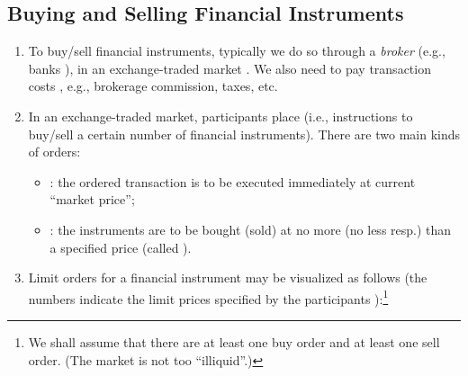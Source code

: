 \subsection{Buying and Selling Financial Instruments}
\begin{enumerate}
\item To buy/sell financial instruments, typically we do so through a
\emph{broker} (e.g., banks ), in an exchange-traded market
.  We also need to pay transaction costs
, e.g., brokerage commission, taxes, etc.

\item In an exchange-traded market, participants place  (i.e.,
instructions to buy/sell a certain number of financial instruments). There are
two main kinds of orders:
\begin{itemize}
\item {}: the ordered transaction is to be executed immediately at
current ``market price'';
\item {}: the instruments are to be bought (sold) at no more
(no less resp.) than a specified price (called ).
\end{itemize}

\item Limit orders for a financial instrument may be visualized as follows (the
numbers indicate the limit prices specified by the participants
):\footnote{We shall assume that there are at least one buy order
and at least one sell order. (The market is not too ``illiquid''.)}
\begin{center}
\end{center}


\end{enumerate}
